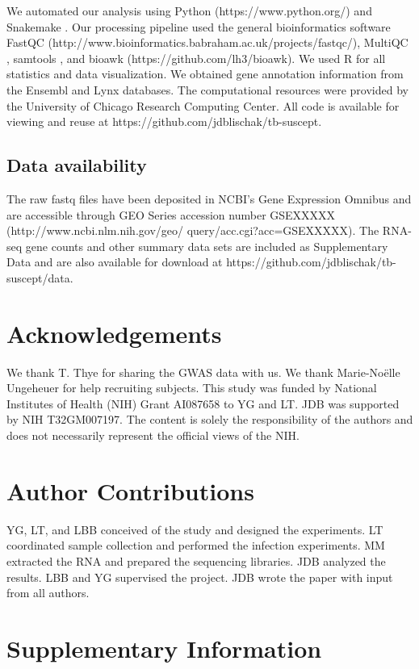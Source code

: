 \documentclass[fleqn,10pt]{wlscirep}
\newcommand{\beginsupplement}{%
 \setcounter{table}{0}
 \renewcommand{\thetable}{S\arabic{table}}%
 \setcounter{figure}{0}
 \renewcommand{\thefigure}{S\arabic{figure}}%
 }
\begin{document}
We automated our analysis using Python (https://www.python.org/) and
Snakemake \cite{Koster2012}. Our processing pipeline used the general
bioinformatics software FastQC
(http://www.bioinformatics.babraham.ac.uk/projects/fastqc/), MultiQC
\cite{Ewels2016}, samtools \cite{Li2009}, and bioawk
(https://github.com/lh3/bioawk). We used R \cite{R2015} for all
statistics and data visualization. We obtained gene annotation
information from the Ensembl \cite{Yates2016} and Lynx
\cite{Sulakhe2016} databases. The computational resources were
provided by the University of Chicago Research Computing Center. All
code is available for viewing and reuse at
https://github.com/jdblischak/tb-suscept.
\subsection*{Data availability}

The raw fastq files have been deposited in NCBI's Gene Expression
Omnibus \cite{Edgar2002} and are accessible through GEO Series
accession number GSEXXXXX (http://www.ncbi.nlm.nih.gov/geo/
query/acc.cgi?acc=GSEXXXXX). The RNA-seq gene counts and other summary
data sets are included as Supplementary Data and are also available
for download at https://github.com/jdblischak/tb-suscept/data.
\section*{Acknowledgements}

We thank T. Thye for sharing the GWAS data with us. We thank
Marie-Noëlle Ungeheuer for help recruiting subjects. This study was
funded by National Institutes of Health (NIH) Grant AI087658 to YG and
LT. JDB was supported by NIH T32GM007197. The content is solely the
responsibility of the authors and does not necessarily represent the
official views of the NIH.
\section*{Author Contributions}

YG, LT, and LBB conceived of the study and designed the experiments.
LT coordinated sample collection and performed the infection
experiments. MM extracted the RNA and prepared the sequencing
libraries. JDB analyzed the results. LBB and YG supervised the
project. JDB wrote the paper with input from all authors.



\clearpage\newpage
\beginsupplement
\section*{Supplementary Information}
\end{document}
